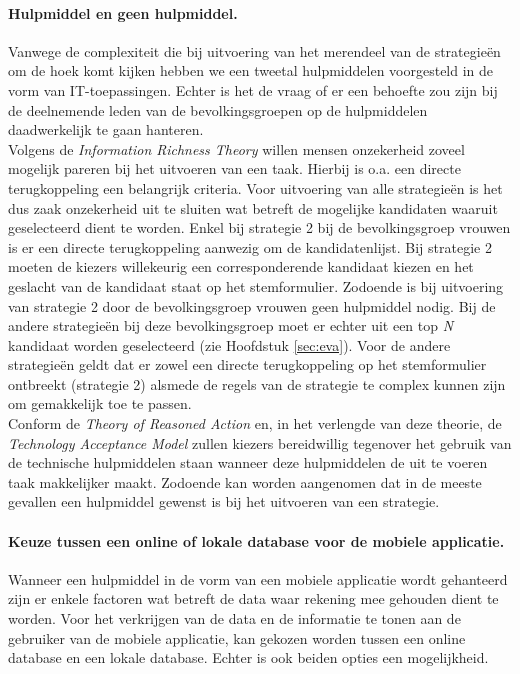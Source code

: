 \paragraph{Hulpmiddel en geen hulpmiddel.} 
Vanwege de complexiteit die bij uitvoering van het merendeel van de strategie\"{e}n om de hoek komt kijken hebben we een tweetal hulpmiddelen voorgesteld in de vorm van IT-toepassingen. Echter is het de vraag of er een behoefte zou zijn bij de deelnemende leden van de bevolkingsgroepen op de hulpmiddelen daadwerkelijk te gaan hanteren. \\
\indent Volgens de \textit{Information Richness Theory} \citep{daft1983information} willen mensen onzekerheid zoveel mogelijk pareren bij het uitvoeren van een taak. Hierbij is o.a. een directe terugkoppeling een belangrijk criteria. Voor uitvoering van alle strategie\"{e}n is het dus zaak onzekerheid uit te sluiten wat betreft de mogelijke kandidaten waaruit geselecteerd dient te worden. Enkel bij strategie 2 bij de bevolkingsgroep vrouwen is er een directe terugkoppeling aanwezig om de kandidatenlijst. Bij strategie 2 moeten de kiezers willekeurig een corresponderende kandidaat kiezen en het geslacht van de kandidaat staat op het stemformulier. Zodoende is bij uitvoering van strategie 2 door de bevolkingsgroep vrouwen geen hulpmiddel nodig. Bij de andere strategie\"{e}n bij deze bevolkingsgroep moet er echter uit een top \textit{N} kandidaat worden geselecteerd (zie Hoofdstuk \ref{sec:eva}). Voor de andere strategie\"{e}n geldt dat er zowel een directe terugkoppeling op het stemformulier ontbreekt (strategie 2) alsmede de regels van de strategie te complex kunnen zijn om gemakkelijk toe te passen. \\
\indent Conform de \textit{Theory of Reasoned Action} \citep{fishbein1977belief,ajzen1991theory} en, in het verlengde van deze theorie, de \textit{Technology Acceptance Model} \citep{davis1989perceived,davis1989user, venkatesh2000determinants} zullen kiezers bereidwillig tegenover het gebruik van de technische hulpmiddelen staan wanneer deze hulpmiddelen de uit te voeren taak makkelijker maakt. Zodoende kan worden aangenomen dat in de meeste gevallen een hulpmiddel gewenst is bij het uitvoeren van een strategie. 


\paragraph{Keuze tussen een online of lokale database voor de mobiele applicatie.}
Wanneer een hulpmiddel in de vorm van een mobiele applicatie wordt gehanteerd zijn er enkele factoren wat betreft de data waar rekening mee gehouden dient te worden. Voor het verkrijgen van de data en de informatie te tonen aan de gebruiker van de mobiele applicatie, kan gekozen worden tussen een online database en een lokale database. Echter is ook beiden opties een mogelijkheid.  

